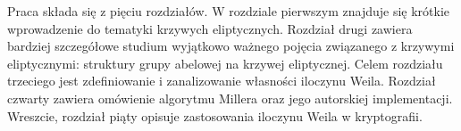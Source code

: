 \noindent
Praca składa się z pięciu rozdziałów.
W rozdziale pierwszym znajduje się krótkie wprowadzenie
do tematyki krzywych eliptycznych.
Rozdział drugi zawiera bardziej szczegółowe studium
wyjątkowo ważnego pojęcia związanego z krzywymi eliptycznymi:
struktury grupy abelowej na krzywej eliptycznej.
Celem rozdziału trzeciego
jest zdefiniowanie i zanalizowanie własności iloczynu Weila.
Rozdział czwarty zawiera omówienie algorytmu Millera
oraz jego autorskiej implementacji.
Wreszcie, rozdział piąty opisuje zastosowania iloczynu Weila w kryptografii.
